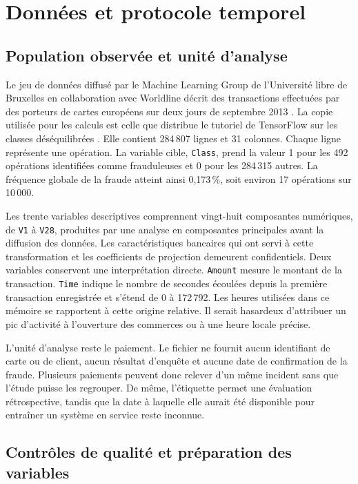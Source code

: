 \documentclass[11pt,a4paper]{article}
\begin{document}
\section{Données et protocole temporel}
\label{sec:protocole-temporel}

\subsection{Population observée et unité d'analyse}

Le jeu de données diffusé par le Machine Learning Group de l'Université libre de Bruxelles en collaboration avec Worldline décrit des transactions effectuées par des porteurs de cartes européens sur deux jours de septembre 2013 \cite{donnees}. La copie utilisée pour les calculs est celle que distribue le tutoriel de TensorFlow sur les classes déséquilibrées \cite{tensorflow}. Elle contient 284\,807 lignes et 31 colonnes. Chaque ligne représente une opération. La variable cible, \texttt{Class}, prend la valeur 1 pour les 492 opérations identifiées comme frauduleuses et 0 pour les 284\,315 autres. La fréquence globale de la fraude atteint ainsi 0,173\,\%, soit environ 17 opérations sur 10\,000.

Les trente variables descriptives comprennent vingt-huit composantes numériques, de \texttt{V1} à \texttt{V28}, produites par une analyse en composantes principales avant la diffusion des données. Les caractéristiques bancaires qui ont servi à cette transformation et les coefficients de projection demeurent confidentiels. Deux variables conservent une interprétation directe. \texttt{Amount} mesure le montant de la transaction. \texttt{Time} indique le nombre de secondes écoulées depuis la première transaction enregistrée et s'étend de 0 à 172\,792. Les heures utilisées dans ce mémoire se rapportent à cette origine relative. Il serait hasardeux d'attribuer un pic d'activité à l'ouverture des commerces ou à une heure locale précise.

L'unité d'analyse reste le paiement. Le fichier ne fournit aucun identifiant de carte ou de client, aucun résultat d'enquête et aucune date de confirmation de la fraude. Plusieurs paiements peuvent donc relever d'un même incident sans que l'étude puisse les regrouper. De même, l'étiquette permet une évaluation rétrospective, tandis que la date à laquelle elle aurait été disponible pour entraîner un système en service reste inconnue.

\subsection{Contrôles de qualité et préparation des variables}
\end{document}

